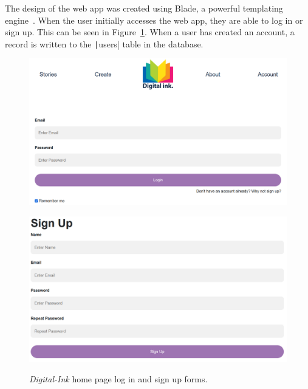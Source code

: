 The design of the web app was created using Blade, a powerful templating engine~\citep{laravel2022blade}.
When the user initially accesses the web app, they are able to log in or sign up.
This can be seen in Figure~\ref{fig:digital-ink-home-and-sign-up}.
When a user has created an account, a record is written to the \texttt|users| table in the database.

\begin{figure}[!htbp]
    \centering
    \begin{minipage}{.5\textwidth}
        \centering
        \includegraphics[width=1\linewidth]{resources/webapp/digital-ink-home}
        \label{fig:digital-ink-home}
    \end{minipage}%
    \begin{minipage}{.5\textwidth}
        \centering
        \includegraphics[width=1\linewidth]{resources/webapp/digital-ink-sign-up}
        \label{fig:digital-ink-sign-up}
    \end{minipage}
    \caption{\textit{Digital-Ink} home page log in and sign up forms.}
    \label{fig:digital-ink-home-and-sign-up}
\end{figure}


